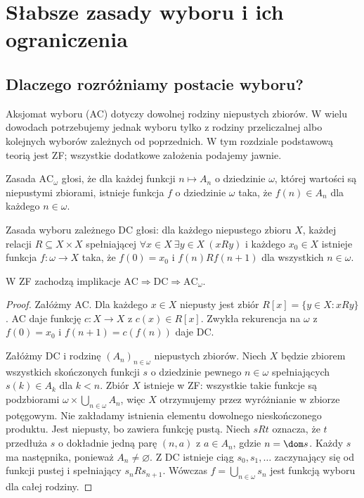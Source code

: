 \chapter{Słabsze zasady wyboru i ich ograniczenia}\label{ch:weak-choice}

\providecommand{\atlasref}[2]{#2}
\section{Dlaczego rozróżniamy postacie wyboru?}
Aksjomat wyboru (AC) dotyczy dowolnej rodziny niepustych zbiorów. W wielu dowodach potrzebujemy jednak wyboru tylko z rodziny przeliczalnej albo kolejnych wyborów zależnych od poprzednich. W tym rozdziale podstawową teorią jest ZF; wszystkie dodatkowe założenia podajemy jawnie.
\begin{definicja}\label{def:ac-omega}
Zasada $\mathrm{AC}_{\omega}$ głosi, że dla każdej funkcji $n\mapsto A_n$ o dziedzinie $\omega$, której wartości są niepustymi zbiorami, istnieje funkcja $f$ o dziedzinie $\omega$ taka, że $f(n)\in A_n$ dla każdego $n\in\omega$.
\end{definicja}
\begin{definicja}\label{def:dc}
Zasada wyboru zależnego $\mathrm{DC}$ głosi: dla każdego niepustego zbioru $X$, każdej relacji $R\subseteq X\times X$ spełniającej $\forall x\in X\ \exists y\in X\ (xRy)$ i każdego $x_0\in X$ istnieje funkcja $f:\omega\to X$ taka, że $f(0)=x_0$ i $f(n)Rf(n+1)$ dla wszystkich $n\in\omega$.
\end{definicja}
\begin{twierdzenie}\label{thm:choice-chain}
W ZF zachodzą implikacje $\mathrm{AC}\Rightarrow\mathrm{DC}\Rightarrow\mathrm{AC}_{\omega}$.
\end{twierdzenie}
\begin{proof}
Załóżmy AC. Dla każdego $x\in X$ niepusty jest zbiór $R[x]=\{y\in X:xRy\}$. AC daje funkcję $c:X\to X$ z $c(x)\in R[x]$. Zwykła rekurencja na $\omega$ z $f(0)=x_0$ i $f(n+1)=c(f(n))$ daje DC.

Załóżmy DC i rodzinę $(A_n)_{n\in\omega}$ niepustych zbiorów. Niech $X$ będzie zbiorem wszystkich skończonych funkcji $s$ o dziedzinie pewnego $n\in\omega$ spełniających $s(k)\in A_k$ dla $k<n$. Zbiór $X$ istnieje w ZF: wszystkie takie funkcje są podzbiorami $\omega\times\bigcup_{n\in\omega}A_n$, więc $X$ otrzymujemy przez wyróżnianie w zbiorze potęgowym. Nie zakładamy istnienia elementu dowolnego nieskończonego produktu. Jest niepusty, bo zawiera funkcję pustą. Niech $sRt$ oznacza, że $t$ przedłuża $s$ o dokładnie jedną parę $(n,a)$ z $a\in A_n$, gdzie $n=\dom s$. Każdy $s$ ma następnika, ponieważ $A_n\ne\varnothing$. Z DC istnieje ciąg $s_0,s_1,\ldots$ zaczynający się od funkcji pustej i spełniający $s_nRs_{n+1}$. Wówczas $f=\bigcup_{n\in\omega}s_n$ jest funkcją wyboru dla całej rodziny.
\end{proof}
